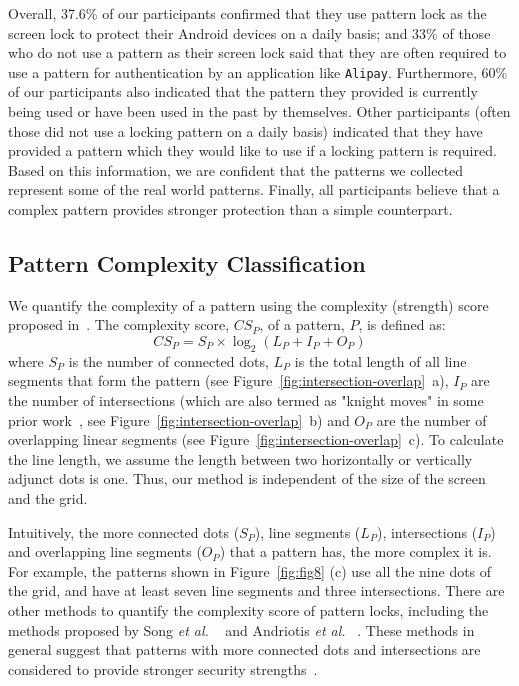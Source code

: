      Overall, 37.6\% of our participants confirmed that they use pattern lock as the screen lock to
     protect their Android devices on a daily basis; and 33\% of those  who do not use a pattern as their screen lock said that they
     are often required to use a pattern for authentication by an application like \texttt{Alipay}. Furthermore, 60\%
     of our participants also indicated that the pattern they provided is currently being used
     or have been used in the past by themselves. Other participants (often those did not use a locking pattern on a daily basis) indicated that they
     have provided a pattern which they would like to use if a locking
     pattern is required. Based on this information, we are confident
     that the patterns we collected represent some of the real world
     patterns. Finally, all participants believe that a complex pattern provides stronger protection than a simple counterpart.

    \subsection{Pattern Complexity Classification}
    \label{section: pattern-complexity-classification}
    We quantify the complexity of a pattern using the complexity (strength) score proposed in~\cite{sun2014dissecting}.
        The complexity score, $CS_{P}$, of a pattern, $P$, is defined as:
    \begin{equation}
      CS_{P}=S_{P}\times\log_{2}(L_{P}+I_{P}+O_{P})
    \label{equ:compscore}
    \end{equation}
    where $S_{P}$ is the number of connected dots, $L_{P}$ is the
    total length of all line segments that form the pattern (see
    Figure~\ref{fig:intersection-overlap}~a), $I_{P}$ are the number of
    intersections (which are also termed as "knight moves" in some prior
    work~\cite{vonZezschwitz:2015:EDB:2702123.2702202}, see
    Figure~\ref{fig:intersection-overlap}~b) and $O_{P}$ are the number of
    overlapping linear segments (see
    Figure~\ref{fig:intersection-overlap}~c).  To calculate the line length,
    we assume the length between two horizontally or vertically adjunct dots
    is one. Thus, our method is independent of the size of the screen and the
    grid.


    Intuitively, the more connected dots ($S_{P}$), line segments ($L_{P}$),
    intersections ($I_{P}$) and overlapping line segments ($O_{P}$) that a
    pattern has, the more complex it is. For example, the patterns shown in
    Figure~\ref{fig:fig8} (c) use all the nine dots of the grid, and have  at
    least seven line segments and three intersections.
    There are other methods to quantify the complexity score of pattern locks, including the methods proposed by Song \emph{et al.} ~\cite{Song2015On} and Andriotis \emph{et al.}
    ~\cite{Andriotis2014Complexity}. These methods in general suggest that patterns with more connected dots and intersections are considered to provide stronger security strengths~\cite{Heidt2016Refining}.

